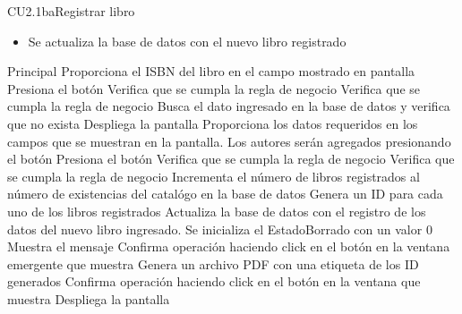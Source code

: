 \begin{UseCase}{CU2.1ba}{Registrar libro}
{			\begin{itemize}
				\item Se actualiza la base de datos con el nuevo libro registrado
			\end{itemize}			
		}
\end{UseCase}


\begin{UCtrayectoria}{Principal}
		\UCpaso[\UCactor] Proporciona el ISBN del libro en el campo mostrado en pantalla 
		\UCpaso[\UCactor] Presiona el botón  
		\UCpaso[\UCsist] Verifica que se cumpla la regla de negocio  
		\UCpaso[\UCsist] Verifica que se cumpla la regla de negocio  
		\UCpaso[\UCsist] Busca el dato ingresado en la base de datos  y verifica que no exista 
		\UCpaso[\UCsist] Despliega la pantalla 
		\UCpaso[\UCactor] Proporciona los datos requeridos en los campos que se muestran en la pantalla. Los autores serán agregados presionando el botón 
		\UCpaso[\UCactor] Presiona el botón  
		\UCpaso[\UCsist] Verifica que se cumpla la regla de negocio  
		\UCpaso[\UCsist] Verifica que se cumpla la regla de negocio  
		\UCpaso[\UCsist] Incrementa el número de libros registrados al número de existencias del catalógo en la base de datos
		\UCpaso[\UCsist] Genera un ID para cada uno de los libros registrados
		\UCpaso[\UCsist] Actualiza la base de datos con el registro de los datos del nuevo libro ingresado. Se inicializa el EstadoBorrado con un valor 0 
		\UCpaso[\UCsist] Muestra el mensaje 
		\UCpaso[\UCactor] Confirma operación haciendo click en el botón  en la ventana emergente que muestra						
		\UCpaso[\UCsist] Genera un archivo PDF con una etiqueta de los ID generados
		\UCpaso[\UCactor] Confirma operación haciendo click en el botón  en la ventana que muestra
		\UCpaso[\UCsist] Despliega la pantalla 
\end{UCtrayectoria}


